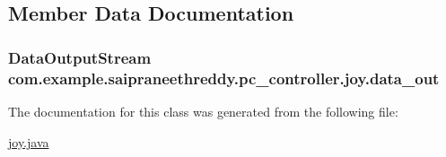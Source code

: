 \subsection{Member Data Documentation}
\subsubsection[{\texorpdfstring{data\+\_\+out}{data_out}}]{\setlength{\rightskip}{0pt plus 5cm}Data\+Output\+Stream com.\+example.\+saipraneethreddy.\+pc\+\_\+controller.\+joy.\+data\+\_\+out\hspace{0.3cm}{\ttfamily [package]}}\hypertarget{classcom_1_1example_1_1saipraneethreddy_1_1pc__controller_1_1joy_aa15f201983dc6fdfe9883f973ca916dd}{}\label{classcom_1_1example_1_1saipraneethreddy_1_1pc__controller_1_1joy_aa15f201983dc6fdfe9883f973ca916dd}


The documentation for this class was generated from the following file\+:\begin{DoxyCompactItemize}
\item 
\hyperlink{joy_8java}{joy.\+java}\end{DoxyCompactItemize}
